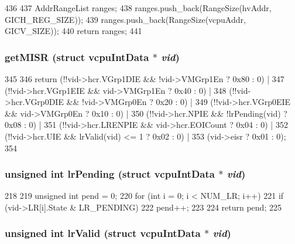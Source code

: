 \begin{DoxyCode}
436 {
437     AddrRangeList ranges;
438     ranges.push_back(RangeSize(hvAddr, GICH_REG_SIZE));
439     ranges.push_back(RangeSize(vcpuAddr, GICV_SIZE));
440     return ranges;
441 }
\end{DoxyCode}
\hypertarget{classVGic_aef2af82ff4c26ce727729ce60f587ee3}{
\subsubsection[{getMISR}]{ getMISR (struct vcpuIntData $\ast$ {\em vid})}}
\label{classVGic_aef2af82ff4c26ce727729ce60f587ee3}



\begin{DoxyCode}
345 {
346     return (!!vid->hcr.VGrp1DIE && !vid->VMGrp1En ? 0x80 : 0) |
347         (!!vid->hcr.VGrp1EIE &&  vid->VMGrp1En ? 0x40 : 0) |
348         (!!vid->hcr.VGrp0DIE && !vid->VMGrp0En ? 0x20 : 0) |
349         (!!vid->hcr.VGrp0EIE &&  vid->VMGrp0En ? 0x10 : 0) |
350         (!!vid->hcr.NPIE && !lrPending(vid) ? 0x08 : 0) |
351         (!!vid->hcr.LRENPIE && vid->hcr.EOICount ? 0x04 : 0) |
352         (!!vid->hcr.UIE && lrValid(vid) <= 1 ? 0x02 : 0) |
353         (vid->eisr ? 0x01 : 0);
354 }
\end{DoxyCode}
\hypertarget{classVGic_ae75cd8cf3bee8ac63664bc65d393bee8}{
\subsubsection[{lrPending}]{\setlength{\rightskip}{0pt plus 5cm}unsigned int lrPending (struct vcpuIntData $\ast$ {\em vid})}}
\label{classVGic_ae75cd8cf3bee8ac63664bc65d393bee8}



\begin{DoxyCode}
218     {
219         unsigned int pend = 0;
220         for (int i = 0; i < NUM_LR; i++) {
221             if (vid->LR[i].State & LR_PENDING)
222                 pend++;
223         }
224         return pend;
225     }
\end{DoxyCode}
\hypertarget{classVGic_acd87d736497b629fc35abea04a8d838e}{
\subsubsection[{lrValid}]{\setlength{\rightskip}{0pt plus 5cm}unsigned int lrValid (struct vcpuIntData $\ast$ {\em vid})}}
\label{classVGic_acd87d736497b629fc35abea04a8d838e}



